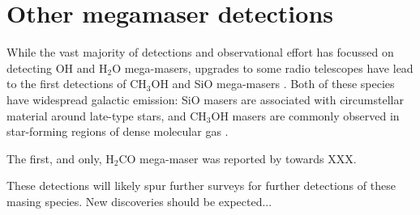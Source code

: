 \section{Other megamaser detections}
\label{sec:other}

While the vast majority of detections and observational effort has focussed on detecting OH and H$_2$O mega-masers, upgrades to some radio telescopes have lead to the first detections of CH$_3$OH and SiO mega-masers \citep{wang2014_SiO_CH3OH, chen_methanol_2015}. Both of these species have widespread galactic emission: SiO masers are associated with circumstellar material around late-type stars, and CH$_3$OH masers are commonly observed in star-forming regions of dense molecular gas \citep{Elitzur_1992}.

The first, and only, H$_2$CO mega-maser was reported by \citet{baan1986} towards XXX.

These detections will likely spur further surveys for further detections of these masing species. New discoveries should be expected...   